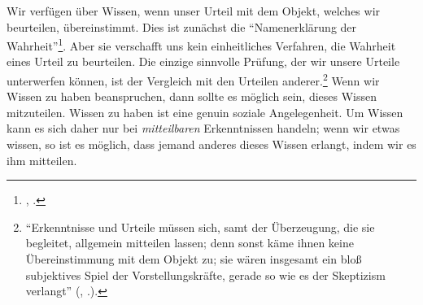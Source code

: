 Wir verfügen über Wissen, wenn unser Urteil mit dem Objekt, welches wir
beurteilen, übereinstimmt. Dies ist zunächst die \enquote{Namenerklärung der
Wahrheit}\footnote{\cite[][B 82]{Kant:KritikderreinenVernunft2003}, \cite[][III:
79.9]{Kant:GesammelteWerke1900ff.}.}. Aber sie verschafft uns kein einheitliches
Verfahren, die Wahrheit eines Urteil zu beurteilen. Die einzige sinnvolle
Prüfung, der wir unsere Urteile unterwerfen können, ist der Vergleich mit den
Urteilen anderer.\footnote{\enquote{Erkenntnisse und Urteile müssen sich, samt
der Überzeugung, die sie
  begleitet, allgemein mitteilen lassen; denn sonst käme ihnen keine
  Übereinstimmung mit dem Objekt zu; sie wären insgesamt ein bloß subjektives
  Spiel der Vorstellungskräfte, gerade so wie es der Skeptizism verlangt}
  \mkbibparens{\cite[][\S~21]{Kant:KritikderUrteilskraft2009}, \cite[][V:
  238.19--23]{Kant:GesammelteWerke1900ff.}.}.} Wenn wir Wissen zu haben
  beanspruchen, dann sollte es möglich sein, dieses Wissen mitzuteilen. Wissen
  zu haben ist eine genuin soziale Angelegenheit. Um
Wissen kann es sich daher nur bei \emph{mitteilbaren} Erkenntnissen handeln;
wenn wir etwas wissen, so ist es möglich, dass jemand anderes dieses Wissen
erlangt, indem wir es ihm mitteilen.

